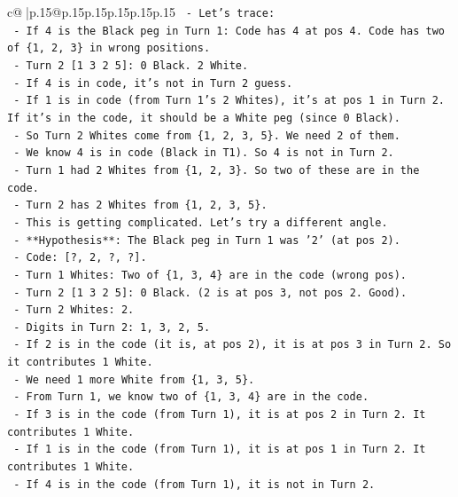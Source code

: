 \documentclass{article}
\begin{document}
{\begin{supertabular}{c@{$\;$}|p{.15\linewidth}@{}p{.15\linewidth}p{.15\linewidth}p{.15\linewidth}p{.15\linewidth}p{.15\linewidth}}
{{{\texttt{  {-} Let's trace:} \\
\texttt{    {-} If 4 is the Black peg in Turn 1: Code has 4 at pos 4. Code has two of \{1, 2, 3\} in wrong positions.} \\
\texttt{    {-} Turn 2 {[}1 3 2 5{]}: 0 Black. 2 White.} \\
\texttt{    {-} If 4 is in code, it's not in Turn 2 guess.} \\
\texttt{    {-} If 1 is in code (from Turn 1's 2 Whites), it's at pos 1 in Turn 2. If it's in the code, it should be a White peg (since 0 Black).} \\
\texttt{    {-} So Turn 2 Whites come from \{1, 2, 3, 5\}. We need 2 of them.} \\
\texttt{    {-} We know 4 is in code (Black in T1). So 4 is not in Turn 2.} \\
\texttt{    {-} Turn 1 had 2 Whites from \{1, 2, 3\}. So two of these are in the code.} \\
\texttt{    {-} Turn 2 has 2 Whites from \{1, 2, 3, 5\}.} \\
\texttt{    {-} This is getting complicated. Let's try a different angle.} \\
\texttt{    {-} **Hypothesis**: The Black peg in Turn 1 was '2' (at pos 2).} \\
\texttt{      {-} Code: {[}?, 2, ?, ?{]}.} \\
\texttt{      {-} Turn 1 Whites: Two of \{1, 3, 4\} are in the code (wrong pos).} \\
\texttt{      {-} Turn 2 {[}1 3 2 5{]}: 0 Black. (2 is at pos 3, not pos 2. Good).} \\
\texttt{      {-} Turn 2 Whites: 2.} \\
\texttt{      {-} Digits in Turn 2: 1, 3, 2, 5.} \\
\texttt{      {-} If 2 is in the code (it is, at pos 2), it is at pos 3 in Turn 2. So it contributes 1 White.} \\
\texttt{      {-} We need 1 more White from \{1, 3, 5\}.} \\
\texttt{      {-} From Turn 1, we know two of \{1, 3, 4\} are in the code.} \\
\texttt{      {-} If 3 is in the code (from Turn 1), it is at pos 2 in Turn 2. It contributes 1 White.} \\
\texttt{      {-} If 1 is in the code (from Turn 1), it is at pos 1 in Turn 2. It contributes 1 White.} \\
\texttt{      {-} If 4 is in the code (from Turn 1), it is not in Turn 2.} \\
}}}
\end{supertabular}}
\end{document}
